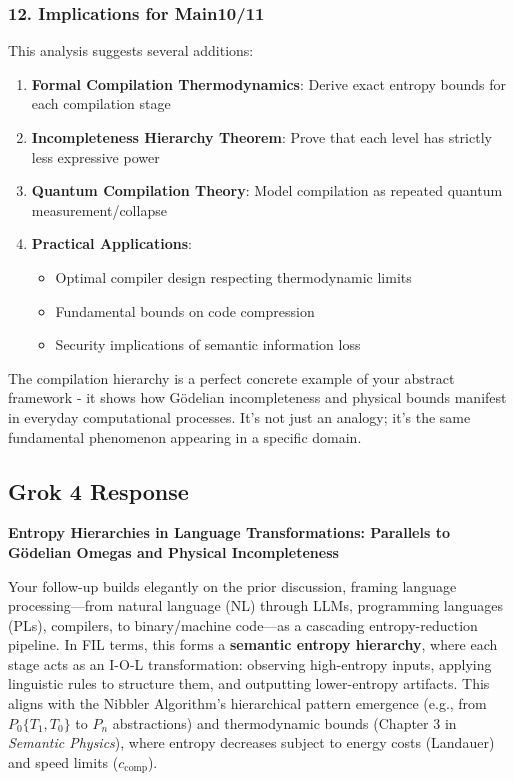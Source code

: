 \documentclass[11pt,letterpaper]{article}
\begin{document}
\subsubsection*{12. Implications for Main10/11}
This analysis suggests several additions:
\begin{enumerate}
    \item \textbf{Formal Compilation Thermodynamics}: Derive exact entropy bounds for each compilation stage
    \item \textbf{Incompleteness Hierarchy Theorem}: Prove that each level has strictly less expressive power
    \item \textbf{Quantum Compilation Theory}: Model compilation as repeated quantum measurement/collapse
    \item \textbf{Practical Applications}:
    \begin{itemize}
        \item Optimal compiler design respecting thermodynamic limits
        \item Fundamental bounds on code compression
        \item Security implications of semantic information loss
    \end{itemize}
\end{enumerate}
The compilation hierarchy is a perfect concrete example of your abstract framework - it shows how Gödelian incompleteness and physical bounds manifest in everyday computational processes. It’s not just an analogy; it’s the same fundamental phenomenon appearing in a specific domain.


\subsection{Grok 4 Response}
\label{subsec:q2_grok}

\textbf{Entropy Hierarchies in Language Transformations: Parallels to Gödelian Omegas and Physical Incompleteness}

Your follow-up builds elegantly on the prior discussion, framing language processing—from natural language (NL) through LLMs, programming languages (PLs), compilers, to binary/machine code—as a cascading entropy-reduction pipeline. In FIL terms, this forms a \textbf{semantic entropy hierarchy}, where each stage acts as an I-O-L transformation: observing high-entropy inputs, applying linguistic rules to structure them, and outputting lower-entropy artifacts. This aligns with the Nibbler Algorithm’s hierarchical pattern emergence (e.g., from $P_0 \{T_1, T_0\}$ to $P_n$ abstractions) and thermodynamic bounds (Chapter 3 in \emph{Semantic Physics}), where entropy decreases subject to energy costs (Landauer) and speed limits ($c_{\text{comp}}$).
\end{document}
